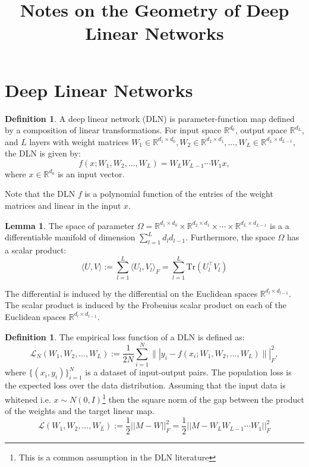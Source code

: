 \documentclass{article}
\title{Notes on the Geometry of Deep Linear Networks}
\theoremstyle{definition}
\newtheorem{lemma}[theorem]{Lemma}
\newtheorem{definition}[theorem]{Definition}
\begin{document}
\maketitle
\section{Deep Linear Networks}\label{sec:dln}
\begin{definition}\label{def:dln}
    A deep linear network (DLN) is parameter-function map defined by a composition of linear transformations. For input space $\mathbb{R}^{d_0}$, output space $\mathbb{R}^{d_L}$, and $L$ layers with weight matrices $W_1 \in \mathbb{R}^{d_1 \times d_0}, W_2 \in \mathbb{R}^{d_2 \times d_1}, \ldots, W_L \in \mathbb{R}^{d_L \times d_{L-1}}$, the DLN is given by:
    \begin{equation*}
        f(x; W_1, W_2, \ldots, W_L) = W_L W_{L-1} \cdots W_1 x,
    \end{equation*}
    where $x \in \mathbb{R}^{d_0}$ is an input vector.
\end{definition}
Note that the DLN $f$ is a polynomial function of the entries of the weight matrices and linear in the input $x$.
\begin{lemma}\label{lem:parameter-manifold}
    The space of parameter $\Omega = $$\mathbb{R}^{d_1 \times d_0} \times \mathbb{R}^{d_2 \times d_1} \times \cdots \times \mathbb{R}^{d_L \times d_{L-1}}$ is a a differentiable manifold of dimension $\sum_{l=1}^L d_l d_{l-1}$. Furthermore, the space $\Omega$ has a scalar product:
    \begin{equation*}
        \langle U, V \rangle := \sum_{l=1}^L \langle U_l, V_l \rangle_F = \sum_{l=1}^L \text{Tr}(U_l^{\top} V_l)
    \end{equation*}
\end{lemma}
 The differential is induced by the differential on the Euclidean spaces $\mathbb{R}^{d_l \times d_{l-1}}$. The scalar product is induced by the Frobenius scalar product on each of the Euclidean spaces $\mathbb{R}^{d_l \times d_{l-1}}$. 
\begin{definition}\label{def:loss}
    The empirical loss function of a DLN is defined as:
    \begin{equation*}
        \mathcal{L}_N(W_1, W_2, \ldots, W_L) := \frac{1}{2N} \sum_{i=1}^N \||y_i - f(x_i; W_1, W_2, \ldots, W_L)\||_F^2,
    \end{equation*}
    where $\{(x_i, y_i)\}_{i=1}^N$ is a dataset of input-output pairs. The population loss is the expected loss over the data distribution. Assuming that the input data is whitened i.e. $x\sim N(0,I)$\footnote{This is a common assumption in the DLN literature} then the square norm of the gap between the product of the weights and the target linear map.
    \begin{equation*}
        \mathcal{L}(W_1, W_2, \ldots, W_L) := \frac{1}{2}||M - W||_F^2 = \frac{1}{2} ||M - W_L W_{L-1} \cdots W_1||_F^2
    \end{equation*}
\end{definition}
\end{document}
